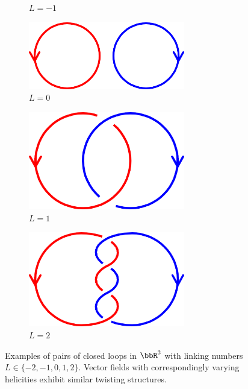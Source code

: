 \begin{figure}[!ht]
\begin{subfigure}{0.1811\textwidth}
            \caption{$L = -1$}
        \end{subfigure}%
        \begin{subfigure}{0.2634\textwidth}
            \centering
            \includegraphics[width = 0.75\textwidth]{2 - fluid component/1 - structures/2 - global/images/0.png}
            \caption{$L = 0$}
        \end{subfigure}%
        \begin{subfigure}{0.1815\textwidth}
            \centering
            \includegraphics[width = 0.75\textwidth]{2 - fluid component/1 - structures/2 - global/images/1.png}
            \caption{$L = 1$}
        \end{subfigure}%
        \begin{subfigure}{0.1872\textwidth}
            \centering
            \includegraphics[width = 0.75\textwidth]{2 - fluid component/1 - structures/2 - global/images/2.png}
            \caption{$L = 2$}
        \end{subfigure}
        \caption{Examples of pairs of closed loops in $\bbR^{3}$ with linking numbers $L  \in  \{-2, -1, 0, 1, 2\}$. Vector fields with correspondingly varying helicities exhibit similar twisting structures.}
        \label{fig:linking numbers}
    \end{figure}

